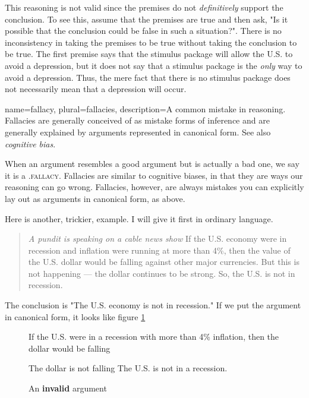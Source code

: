 This reasoning is not valid since the premises do not \textit{definitively} support the conclusion. To see this, assume that the premises are true and then ask, "Is it possible that the conclusion could be false in such a situation?". There is no inconsistency in taking the premises to be true without taking the conclusion to be true. The first premise says that the stimulus package will allow the U.S. to avoid a depression, but it does not say that a stimulus package is the \textit{only }way to avoid a depression. Thus, the mere fact that there is no stimulus package does not necessarily mean that a depression will occur.

{
name=fallacy,
plural=fallacies,
description={A common mistake in reasoning. Fallacies are generally conceived of as mistake forms of inference and are generally explained by arguments represented in canonical form. See also \emph{cognitive bias}.}
}

When an argument resembles a good argument but is actually a bad one, we say it is a .\textsc{\gls{fallacy}}\label{def:fallacy}. Fallacies are similar to cognitive biases, in that they are ways our reasoning can go wrong.  Fallacies, however, are always mistakes you can explicitly lay out as arguments in canonical form, as above. 

Here is another, trickier, example. I will give it first in ordinary language.

\begin{quotation} \noindent\textit{A pundit is speaking on a cable news show} If the U.S. economy were in recession and inflation were running at more than 4\%, then the value of the U.S. dollar would be falling against other major currencies. But this is not happening --- the dollar continues to be strong. So, the U.S. is not in recession. \end{quotation}

The conclusion is "The U.S. economy is not in recession." If we put the argument in canonical form, it looks like figure \ref{fig:invalid_recession}

\begin{figure}
\begin{mdframed}[style=mytablebox]
\begin{earg*}
\item If the U.S. were in a recession with more than 4\% inflation, then the dollar would be falling
\item The dollar is not falling
\itemc[.3] The U.S. is not in a recession.
\end{earg*}
\end{mdframed}
\caption{An \textbf{invalid} argument} \label{fig:invalid_recession}
\end{figure}

